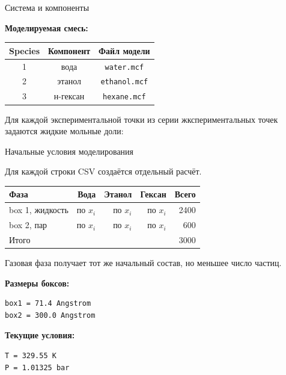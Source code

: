 \documentclass[10pt, aspectratio=169]{beamer}
\begin{document}
\begin{frame}[fragile]{Система и компоненты}

\textbf{Моделируемая смесь:}

\vspace{0.3cm}

\begin{table}
\centering
\begin{tabular}{ccc}
\toprule
\textbf{Species} & \textbf{Компонент} & \textbf{Файл модели} \\
\midrule
1 & вода & \texttt{water.mcf} \\
2 & этанол & \texttt{ethanol.mcf} \\
3 & н-гексан & \texttt{hexane.mcf} \\
\bottomrule
\end{tabular}
\end{table}

\vspace{0.3cm}

Для каждой экспериментальной точки из серии жкспериментальных точек задаются жидкие мольные доли:
\end{frame}

\begin{frame}[fragile]{Начальные условия моделирования}

Для каждой строки CSV создаётся отдельный расчёт.

\vspace{0.25cm}

\begin{table}
\centering
\begin{tabular}{lrrrr}
\toprule
\textbf{Фаза} & \textbf{Вода} & \textbf{Этанол} & \textbf{Гексан} & \textbf{Всего} \\
\midrule
box 1, жидкость & по $x_i$ & по $x_i$ & по $x_i$ & 2400 \\
box 2, пар      & по $x_i$ & по $x_i$ & по $x_i$ & 600 \\
\midrule
Итого & & & & 3000 \\
\bottomrule
\end{tabular}
\end{table}

\vspace{0.25cm}

Газовая фаза получает тот же начальный состав, но меньшее число частиц.

\vspace{0.25cm}

\textbf{Размеры боксов:}

\begin{lstlisting}
box1 = 71.4 Angstrom
box2 = 300.0 Angstrom
\end{lstlisting}

\textbf{Текущие условия:}

\begin{lstlisting}
T = 329.55 K
P = 1.01325 bar
\end{lstlisting}


\end{frame}
\end{document}
